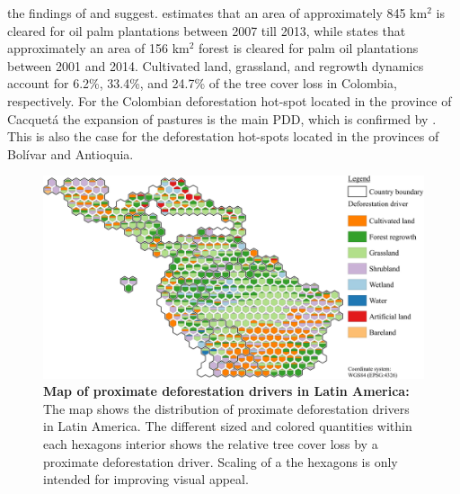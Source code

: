 the findings of \citet{Vijay2018} and \citet{Furumo2017} suggest. \citeauthor{Vijay2018} estimates that an area of approximately 845 km$^2$ is cleared for oil palm plantations between 2007 till 2013, while \citeauthor{Furumo2017} states that approximately an area of 156 km$^2$ forest is cleared for palm oil plantations between 2001 and 2014. Cultivated land, grassland, and regrowth dynamics account for 6.2\%, 33.4\%, and 24.7\% of the tree cover loss in Colombia, respectively. For the Colombian deforestation hot-spot located in the province of Cacquetá the expansion of pastures is the main \ac{PDD}, which is confirmed by \citet{Graesser2015}. This is also the case for the deforestation hot-spots located in the provinces of Bolívar and Antioquia.
			\begin{figure}[ht]
				\centering
				\includegraphics[scale=1]{img/americas_driver_frameless}
				\caption[Map of proximate deforestation drivers in Latin America]{\textbf{Map of proximate deforestation drivers in Latin America:} The map shows the distribution of proximate deforestation drivers in Latin America. The different sized and colored quantities within each hexagons interior shows the relative tree cover loss by a proximate deforestation driver. Scaling of a the hexagons is only intended for improving visual appeal.}
				\label{fig:americas_driver}
			\end{figure}

